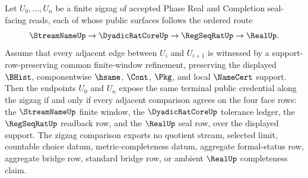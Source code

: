 \begin{theorem}
\label{thm:streamname-l10-ordered-exit-zigzag-confluence}
Let $U_0,\ldots,U_n$ be a finite zigzag of accepted Phase Real and Completion seal-facing reads, each of whose public surfaces follows the ordered route
$$
\StreamNameUp \to \DyadicRatCoreUp \to \RegSeqRatUp \to \RealUp .
$$
Assume that every adjacent edge between $U_i$ and $U_{i+1}$ is witnessed by a support-row-preserving common finite-window refinement, preserving the displayed $\BHist$, componentwise $\hsame$, $\Cont$, $\Pkg$, and local $\NameCert$ support. Then the endpoints $U_0$ and $U_n$ expose the same terminal public credential along the zigzag if and only if every adjacent comparison agrees on the four face rows: the $\StreamNameUp$ finite window, the $\DyadicRatCoreUp$ tolerance ledger, the $\RegSeqRatUp$ readback row, and the $\RealUp$ seal row, over the displayed support. The zigzag comparison exports no quotient stream, selected limit, countable choice datum, metric-completeness datum, aggregate formal-status row, aggregate bridge row, standard bridge row, or ambient $\RealUp$ completeness claim.
\end{theorem}
